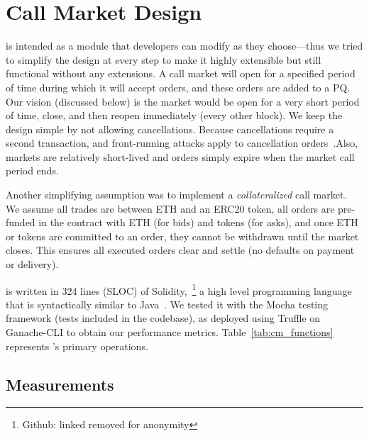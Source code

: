 
\section{Call Market Design}




\cm is intended as a module that developers can modify as they choose---thus we tried to simplify the design at every step to make it highly extensible but still functional without any extensions. A call market will open for a specified period of time during which it will accept orders, and these orders are added to a PQ. Our vision (discussed below) is the market would be open for a very short period of time, close, and then reopen immediately (\eg every other block). We keep the design simple by not allowing cancellations. Because cancellations require a second transaction, and front-running attacks apply to cancellation orders~\cite{eskandari2019sok}.Also, markets are relatively short-lived and orders simply expire when the market call period ends.

Another simplifying assumption was to implement a \textit{collateralized} call market. We assume all trades are between ETH and an ERC20 token, all orders are pre-funded in the contract with ETH (for bids) and tokens (for asks), and once ETH or tokens are committed to an order, they cannot be withdrawn until the market closes. This ensures all executed orders clear and settle (\ie no defaults on payment or delivery).


\cm is written in 324 lines (SLOC) of Solidity,~\footnote{Github: linked removed for anonymity} a high level programming language that is syntactically similar to Java~\cite{Ethereum41:online}. We tested it with the Mocha testing framework (tests included in the codebase), as deployed using Truffle on Ganache-CLI to obtain our performance metrics. Table~\ref{tab:cm_functions} represents \cm's primary operations.


 \subsection{Measurements}
 
